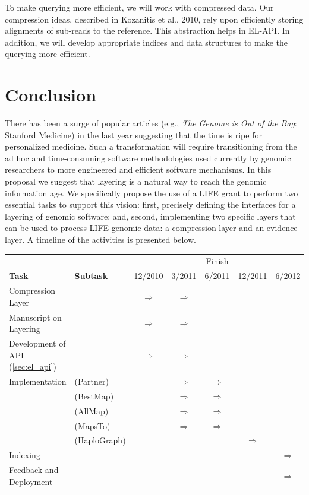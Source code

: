 \documentclass[11pt]{article}
\begin{document}
To make querying more efficient, we will work with compressed
data. Our compression ideas, described in Kozanitis et al., 2010, rely
upon efficiently storing alignments of sub-reads to the
reference. This abstraction helps in EL-API. In addition, we will
develop appropriate indices and data structures to make the querying
more efficient.



\section{Conclusion}

There has been a surge of popular articles (e.g., {\em The Genome is
  Out of the Bag}: Stanford Medicine) in the last year suggesting that
the time is ripe for personalized medicine.  Such a transformation
will require transitioning from the ad hoc and time-consuming software
methodologies used currently by genomic researchers to more engineered and efficient
software mechanisms.  In this proposal we suggest that layering is a
natural way to reach the genomic information age.  We specifically
propose the use of a LIFE grant to perform two essential tasks to
support this vision: first, precisely defining the interfaces for a
layering of genomic software; and, second, implementing two specific
layers that can be used to process LIFE genomic data: a compression
layer and an evidence layer. A timeline of the activities
is presented below.\\


\begin{tabular}[h]{|l|l|ccccc|}\hline
  &&\multicolumn{5}{|c|}{Finish}\\\cline{3-7}
  {\bf Task } & {\bf Subtask}& 12/2010 & 3/2011 & 6/2011  & 12/2011 &  6/2012 \\\hline\hline
  Compression Layer && $\Rightarrow$ & $\Rightarrow$ & & & \\\hline
  Manuscript on Layering & & $\Rightarrow$ & $\Rightarrow$ & & & \\ \hline
  Development of API  (\ref{sec:el_api}) &  &$\Rightarrow$ &$\Rightarrow$ & & &\\\hline
  Implementation & ({\sc Partner})&  &$\Rightarrow$ &$\Rightarrow$ & & \\ 
  & ({\sc BestMap})&  &$\Rightarrow$ &$\Rightarrow$ & & \\ 
  & ({\sc AllMap})&  &$\Rightarrow$ &$\Rightarrow$ & & \\ 
  & ({\sc MapsTo})&  &$\Rightarrow$ &$\Rightarrow$ & & \\
  &({\sc HaploGraph})&  &  & &$\Rightarrow$  & \\\hline
  Indexing  & &  & & & &$\Rightarrow$  \\\hline
  Feedback and Deployment& &  & & & &$\Rightarrow$  \\ \hline
\end{tabular}
\end{document}
